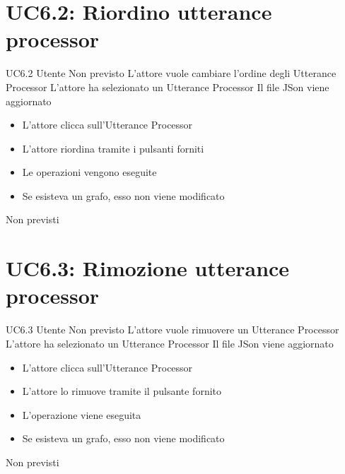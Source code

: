 \documentclass[../AnalisideiRequisiti.tex]{subfiles}
\begin{document}
\section{UC6.2: Riordino utterance processor}
\UserCase
{UC6.2}
{Utente}
{Non previsto}
{L'attore vuole cambiare l'ordine degli Utterance Processor}
{L'attore ha selezionato un Utterance Processor }
{Il file JSon viene aggiornato}
{
	\begin{itemize}
		\item{} L'attore clicca sull'Utterance Processor 
		\item{} L'attore riordina tramite i pulsanti forniti	
		\item{} Le operazioni vengono eseguite
		\item{} Se esisteva un grafo, esso non viene modificato
		
	\end{itemize}
}
{Non previsti}

\section{UC6.3: Rimozione utterance processor}
\UserCase
{UC6.3}
{Utente}
{Non previsto}
{L'attore vuole rimuovere un Utterance Processor}
{L'attore ha selezionato un Utterance Processor }
{Il file JSon viene aggiornato}
{
	\begin{itemize}
		\item{} L'attore clicca sull'Utterance Processor 
		\item{} L'attore lo rimuove tramite il pulsante fornito	
		\item{} L'operazione viene eseguita
		\item{} Se esisteva un grafo, esso non viene modificato
		
	\end{itemize}
}
{Non previsti}
\end{document}
